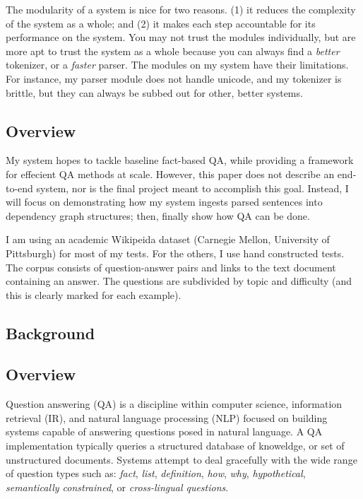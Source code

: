 \documentclass[twoside]{article}
\begin{document}
The modularity of a system is nice for two reasons.  (1) it reduces the complexity of the system as a whole; and (2) it makes each step accountable for its performance on the system.  You may not trust the modules individually, but are more apt to trust the system as a whole because you can always find a \textit{better} tokenizer, or a \textit{faster} parser.  The modules on my system have their limitations.  For instance, my parser module does not handle unicode, and my tokenizer is brittle, but they can always be subbed out for other, better systems.

\subsection{Overview}

My system hopes to tackle baseline fact-based QA, while providing a framework for effecient QA methods at scale. However, this paper does not describe an end-to-end system, nor is the final project meant to accomplish this goal.  Instead, I will focus on demonstrating how my system ingests parsed sentences into dependency graph structures; then, finally show how QA can be done.

I am using an academic Wikipeida dataset (Carnegie Mellon, University of Pittsburgh) for most of my tests.  For the others, I use hand constructed tests.  The corpus consists of question-answer pairs and links to the text document containing an answer.  The questions are subdivided by topic and difficulty (and this is clearly marked for each example).

\subsection{Background}

\subsection{Overview}

Question answering (QA) is a discipline within computer science, information retrieval (IR), and natural language processing (NLP) focused on building systems capable of answering questions posed in natural language. A QA implementation typically queries a structured database of knoweldge, or set of unstructured documents.  Systems attempt to deal gracefully with the wide range of question types such as: \textit{fact}, \textit{list}, \textit{definition}, \textit{how}, \textit{why}, \textit{hypothetical}, \textit{semantically constrained}, or \textit{cross-lingual questions}.
\end{document}
